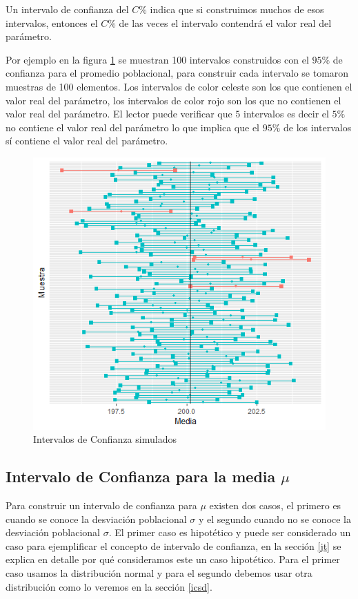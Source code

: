 \documentclass[letterpaper,]{book}
\begin{document}
Un intervalo de confianza del \(C \%\) indica que si construimos muchos de esos intervalos, entonces el \(C \%\) de las veces el intervalo contendrá el valor real del parámetro.

Por ejemplo en la figura \ref{fig:ic} se muestran 100 intervalos construidos con el \(95 \%\) de confianza para el promedio poblacional, para construir cada intervalo se tomaron muestras de 100 elementos. Los intervalos de color celeste son los que contienen el valor real del parámetro, los intervalos de color rojo son los que no contienen el valor real del parámetro. El lector puede verificar que \(5\) intervalos es decir el \(5 \%\) no contiene el valor real del parámetro lo que implica que el \(95 \%\) de los intervalos sí contiene el valor real del parámetro.

\begin{figure}[h!]

{\centering \includegraphics[width=0.7\linewidth]{ic} 

}

\caption{Intervalos de Confianza simulados}\label{fig:ic}
\end{figure}

\hypertarget{icmu}{%
\subsection{\texorpdfstring{Intervalo de Confianza para la media \(\mu\)}{Intervalo de Confianza para la media \textbackslash{}mu}}\label{icmu}}

Para construir un intervalo de confianza para \(\mu\) existen dos casos, el primero es cuando se conoce la desviación poblacional \(\sigma\) y el segundo cuando no se conoce la desviación poblacional \(\sigma\). El primer caso es hipotético y puede ser considerado un caso para ejemplificar el concepto de intervalo de confianza, en la sección \ref{jt} se explica en detalle por qué consideramos este un caso hipotético. Para el primer caso usamos la distribución normal y para el segundo debemos usar otra distribución como lo veremos en la sección \ref{icsd}.
\end{document}

